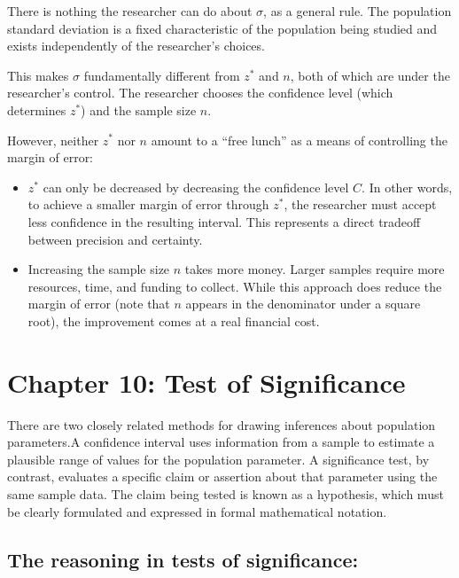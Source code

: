 \documentclass[
  letterpaper,
  DIV=11,
  numbers=noendperiod]{scrreprt}
\begin{document}
There is nothing the researcher can do about \(\sigma\), as a general
rule. The population standard deviation is a fixed characteristic of the
population being studied and exists independently of the researcher's
choices.

This makes \(\sigma\) fundamentally different from \(z^*\) and \(n\),
both of which are under the researcher's control. The researcher chooses
the confidence level (which determines \(z^*\)) and the sample size
\(n\).

However, neither \(z^*\) nor \(n\) amount to a ``free lunch'' as a means
of controlling the margin of error:

\begin{itemize}
\item
  \(z^*\) can only be decreased by decreasing the confidence level
  \(C\). In other words, to achieve a smaller margin of error through
  \(z^*\), the researcher must accept less confidence in the resulting
  interval. This represents a direct tradeoff between precision and
  certainty.
\item
  Increasing the sample size \(n\) takes more money. Larger samples
  require more resources, time, and funding to collect. While this
  approach does reduce the margin of error (note that \(n\) appears in
  the denominator under a square root), the improvement comes at a real
  financial cost.
\end{itemize}


\chapter{Chapter 10: Test of
Significance}\label{chapter-10-test-of-significance}

There are two closely related methods for drawing inferences about
population parameters.A confidence interval uses information from a
sample to estimate a plausible range of values for the population
parameter. A significance test, by contrast, evaluates a specific claim
or assertion about that parameter using the same sample data. The claim
being tested is known as a hypothesis, which must be clearly formulated
and expressed in formal mathematical notation.

\section{The reasoning in tests of
significance:}\label{the-reasoning-in-tests-of-significance}
\end{document}
